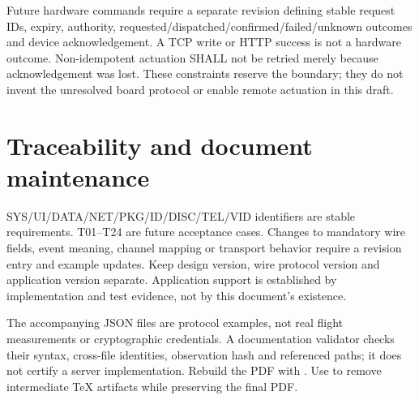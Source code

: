 Future hardware commands require a separate revision defining stable request IDs,
expiry, authority, requested/dispatched/confirmed/failed/unknown outcomes and
device acknowledgement. A TCP write or HTTP success is not a hardware outcome.
Non-idempotent actuation SHALL not be retried merely because acknowledgement was
lost. These constraints reserve the boundary; they do not invent the unresolved
board protocol or enable remote actuation in this draft.

\section{Traceability and document maintenance}
SYS/UI/DATA/NET/PKG/ID/DISC/TEL/VID identifiers are stable requirements. T01--T24
are future acceptance cases. Changes to mandatory wire fields, event meaning,
channel mapping or transport behavior require a revision entry and example
updates. Keep design version, wire protocol version and application version
separate. Application support is established by implementation and test evidence,
not by this document's existence.

The accompanying JSON files are protocol examples, not real flight measurements
or cryptographic credentials. A documentation validator checks their syntax,
cross-file identities, observation hash and referenced paths; it does not certify
a server implementation. Rebuild the PDF with . Use 
to remove intermediate TeX artifacts while preserving the final PDF.
